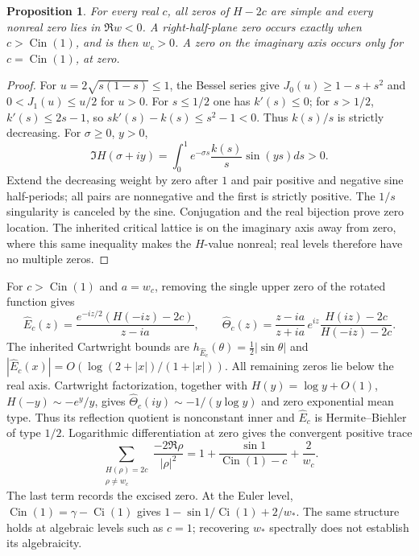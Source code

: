 \documentclass[11pt,a4paper]{article}
\newtheorem{proposition}[theorem]{Proposition}
\theoremstyle{definition}
\theoremstyle{remark}
\numberwithin{equation}{section}
\begin{document}
\begin{proposition}\label{ar:reallevels}
For every real $c$, all zeros of $H-2c$ are simple and every nonreal zero
lies in $\Re w<0$.  A right-half-plane zero occurs exactly when
$c>\operatorname{Cin}(1)$, and is then $w_c>0$.  A zero on the imaginary
axis occurs only for $c=\operatorname{Cin}(1)$, at zero.
\end{proposition}
\begin{proof}
For $u=2\sqrt{s(1-s)}\le1$, the Bessel series give
$J_0(u)\ge1-s+s^2$ and $0<J_1(u)\le u/2$ for $u>0$.
For $s\le1/2$ one has $k'(s)\le0$; for $s>1/2$,
$k'(s)\le2s-1$, so $sk'(s)-k(s)\le s^2-1<0$.
Thus $k(s)/s$ is strictly decreasing.  For $\sigma\ge0$, $y>0$,
\[
 \Im H(\sigma+iy)=\int_0^1e^{-\sigma s}\frac{k(s)}s\sin(ys)ds>0.
\]
Extend the decreasing weight by zero after $1$ and pair positive and
negative sine half-periods; all pairs are nonnegative and the first is
strictly positive.  The $1/s$ singularity is canceled by the sine.
Conjugation and the real bijection prove zero location.  The inherited
critical lattice is on the imaginary axis away from zero, where this same
inequality makes the $H$-value nonreal; real levels therefore have no
multiple zeros.
\end{proof}
For $c>\operatorname{Cin}(1)$ and $a=w_c$, removing the single upper
zero of the rotated function gives
\[
 \widehat E_c(z)=\frac{e^{-iz/2}(H(-iz)-2c)}{z-ia},\qquad
 \widehat\Theta_c(z)=\frac{z-ia}{z+ia}\,
 e^{iz}\frac{H(iz)-2c}{H(-iz)-2c}.
\]
The inherited Cartwright bounds are
$h_{\widehat E_c}(\theta)=\tfrac12|\sin\theta|$ and
$|\widehat E_c(x)|=O(\log(2+|x|)/(1+|x|))$.
All remaining zeros lie below the real axis.  Cartwright factorization,
together with $H(y)=\log y+O(1)$, $H(-y)\sim-e^y/y$, gives
$\widehat\Theta_c(iy)\sim-1/(y\log y)$ and zero exponential mean type.
Thus its reflection quotient is nonconstant inner and $\widehat E_c$ is
Hermite--Biehler of type $1/2$.
Logarithmic differentiation at zero gives the convergent positive trace
\[
 \sum_{\substack{H(\rho)=2c\\\rho\ne w_c}}
 \frac{-2\Re\rho}{|\rho|^2}
 =1+\frac{\sin1}{\operatorname{Cin}(1)-c}+\frac2{w_c}.
\]
The last term records the excised zero.  At the Euler level,
$\operatorname{Cin}(1)=\gamma-\operatorname{Ci}(1)$ gives
$1-\sin1/\operatorname{Ci}(1)+2/w_*$.  The same structure holds at
algebraic levels such as $c=1$; recovering $w_*$ spectrally does not
establish its algebraicity.
\end{document}
